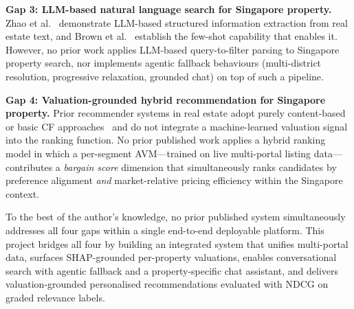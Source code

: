 \textbf{Gap 3: LLM-based natural language search for Singapore property.}
Zhao et al.~\cite{zhao2024llm} demonstrate LLM-based structured information extraction from real estate text,
and Brown et al.~\cite{brown2020language} establish the few-shot capability that enables it.
However, no prior work applies LLM-based query-to-filter parsing to Singapore property search,
nor implements agentic fallback behaviours (multi-district resolution, progressive relaxation,
grounded chat) on top of such a pipeline.

\textbf{Gap 4: Valuation-grounded hybrid recommendation for Singapore property.}
Prior recommender systems in real estate adopt purely content-based or basic CF
approaches~\cite{ricci2011introduction} and do not integrate a machine-learned valuation
signal into the ranking function. No prior published work applies a hybrid ranking model
in which a per-segment AVM---trained on live multi-portal listing data---contributes a
\textit{bargain score} dimension that simultaneously ranks candidates by preference
alignment \emph{and} market-relative pricing efficiency within the Singapore context.

To the best of the author's knowledge, no prior published system simultaneously addresses all
four gaps within a single end-to-end deployable platform. This project bridges all four by
building an integrated system that unifies multi-portal data, surfaces SHAP-grounded per-property
valuations, enables conversational search with agentic fallback and a property-specific
chat assistant, and delivers valuation-grounded personalised recommendations evaluated
with NDCG on graded relevance labels.
